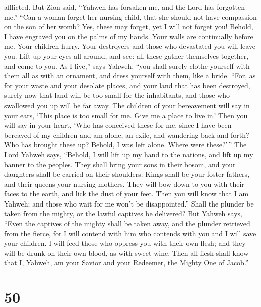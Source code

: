 afflicted.  But Zion said, ``Yahweh has forsaken me, and
the Lord has forgotten me.''  ``Can a woman forget her
nursing child, that she should not have compassion on the son of her
womb? Yes, these may forget, yet I will not forget you! 
Behold, I have engraved you on the palms of my hands. Your walls are
continually before me.  Your children hurry. Your
destroyers and those who devastated you will leave you. 
Lift up your eyes all around, and see: all these gather themselves
together, and come to you. As I live,'' says Yahweh, ``you shall surely
clothe yourself with them all as with an ornament, and dress yourself
with them, like a bride.  ``For, as for your waste and
your desolate places, and your land that has been destroyed, surely now
that land will be too small for the inhabitants, and those who swallowed
you up will be far away.  The children of your
bereavement will say in your ears, `This place is too small for me. Give
me a place to live in.'  Then you will say in your heart,
`Who has conceived these for me, since I have been bereaved of my
children and am alone, an exile, and wandering back and forth? Who has
brought these up? Behold, I was left alone. Where were these?'\,''
 The Lord Yahweh says, ``Behold, I will lift up my hand
to the nations, and lift up my banner to the peoples. They shall bring
your sons in their bosom, and your daughters shall be carried on their
shoulders.  Kings shall be your foster fathers, and their
queens your nursing mothers. They will bow down to you with their faces
to the earth, and lick the dust of your feet. Then you will know that I
am Yahweh; and those who wait for me won't be disappointed.''
 Shall the plunder be taken from the mighty, or the
lawful captives be delivered?  But Yahweh says, ``Even
the captives of the mighty shall be taken away, and the plunder
retrieved from the fierce, for I will contend with him who contends with
you and I will save your children.  I will feed those who
oppress you with their own flesh; and they will be drunk on their own
blood, as with sweet wine. Then all flesh shall know that I, Yahweh, am
your Savior and your Redeemer, the Mighty One of Jacob.''

\hypertarget{section-47}{%
\section{50}\label{section-47}}

